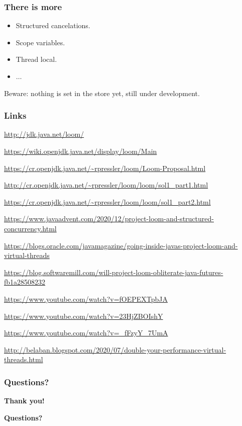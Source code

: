 \documentclass[10pt,utf8]{beamer}
\begin{document}
\begin{frame}
    \frametitle{There is more}
    \begin{itemize}
        \item Structured cancelations.
        \item Scope variables.
        \item Thread local.
        \item $\dots$
    \end{itemize}
    
    \vspace{1cm}
    
    Beware: nothing is set in the store yet, still under development.
\end{frame}

\begin{frame}
    \frametitle{Links}
    \begin{itemize}
    {\scriptsize
        \item \url{http://jdk.java.net/loom/}
        \item \url{https://wiki.openjdk.java.net/display/loom/Main}
        \item \url{https://cr.openjdk.java.net/~rpressler/loom/Loom-Proposal.html}
        \item \url{http://cr.openjdk.java.net/~rpressler/loom/loom/sol1_part1.html}
        \item \url{https://cr.openjdk.java.net/~rpressler/loom/loom/sol1_part2.html}
        \item \url{https://www.javaadvent.com/2020/12/project-loom-and-structured-concurrency.html}
        \item \url{https://blogs.oracle.com/javamagazine/going-inside-javas-project-loom-and-virtual-threads}
        \item \url{https://blog.softwaremill.com/will-project-loom-obliterate-java-futures-fb1a28508232}
        \item \url{https://www.youtube.com/watch?v=fOEPEXTpbJA}
        \item \url{https://www.youtube.com/watch?v=23HjZBOIshY}
        \item \url{https://www.youtube.com/watch?v=_fFzyY_7UmA}
        \item \url{http://belaban.blogspot.com/2020/07/double-your-performance-virtual-threads.html}
    }
    \end{itemize}
\end{frame}

\begin{frame}
    \frametitle{Questions?}
    \centering
     \textbf{\Huge{Thank you!}}
    
    \vspace{1.5cm}
    
    \textbf{\Huge{Questions?}}
    
    \vspace{1cm}
\end{frame}
\end{document}
